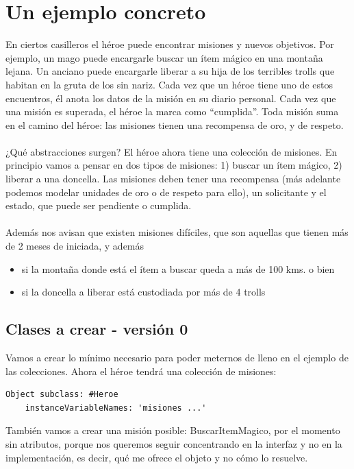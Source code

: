 \documentclass[a4paper,12pt]{book}
\begin{document}
\section{Un ejemplo concreto}
En ciertos casilleros el héroe puede encontrar misiones y nuevos objetivos. Por ejemplo, un mago puede
encargarle buscar un ítem mágico en una montaña lejana. Un anciano puede encargarle liberar a su hija de
los terribles trolls que habitan en la gruta de los sin nariz. Cada vez que un héroe tiene uno de estos
encuentros, él anota los datos de la misión en su diario personal. Cada vez que una misión es superada,
el héroe la marca como “cumplida”. Toda misión suma en el camino del héroe: las misiones tienen una
recompensa de oro, y de respeto.
\\
\\
¿Qué abstracciones surgen? El héroe ahora tiene una colección de misiones. En principio vamos a pensar en
dos tipos de misiones: 1) buscar un ítem mágico, 2) liberar a una doncella. Las misiones deben tener una
recompensa (más adelante podemos modelar unidades de oro o de respeto para ello), un solicitante y el estado,
que puede ser pendiente o cumplida. 
\\
\\
Además nos avisan que existen misiones difíciles, que son aquellas que tienen más de 2 meses de iniciada, 
y además
\begin{itemize}
 \item si la montaña donde está el ítem a buscar queda a más de 100 kms. o bien 
 \item si la doncella a liberar está custodiada por más de 4 trolls
\end{itemize}

\subsection{Clases a crear - versión 0}
Vamos a crear lo mínimo necesario para poder meternos de lleno en el ejemplo de las colecciones.
Ahora el héroe tendrá una colección de misiones:

\begin{lstlisting}[frame=single]
Object subclass: #Heroe
	instanceVariableNames: 'misiones ...'
\end{lstlisting}

También vamos a crear una misión posible: BuscarItemMagico, por el momento sin atributos, porque nos queremos
seguir concentrando en la interfaz y no en la implementación, es decir, qué me ofrece el objeto y no cómo lo
resuelve.
\end{document}
